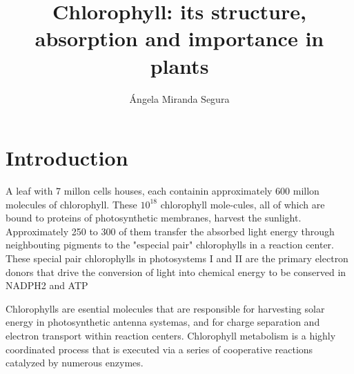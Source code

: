 \documentclass[a4paper, twocolumn, 11pt]{article}
\author{Ángela Miranda Segura}
\title{Chlorophyll: its structure, absorption and importance in plants}
\begin{document}
	\pagestyle{fancy}

\section{Introduction}
 	A leaf with 7 millon cells houses, each containin approximately 600 millon molecules of chlorophyll. These $10^18$ chlorophyll mole-cules, all of which are bound to proteins of photosynthetic membranes, harvest the sunlight. Approximately 250 to 300 of them transfer the absorbed light energy through neighbouting pigments to the "especial pair" chlorophylls in a reaction center. These special pair chlorophylls in photosystems I and II are the primary electron donors that drive the conversion of light into chemical energy to be conserved in NADPH2 and ATP \cite{VonWettstein1995}
 	

	Chlorophylls are esential molecules that are responsible for harvesting solar energy in photosynthetic antenna systemas, and for charge separation and electron transport within reaction centers. Chlorophyll metabolism is a highly coordinated process that is executed via a series of cooperative reactions catalyzed by numerous enzymes.
	
\end{document}
